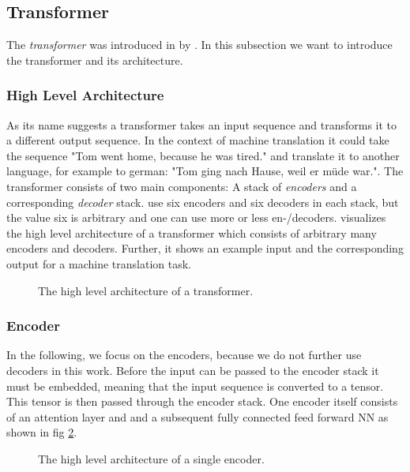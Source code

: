 
\subsection{Transformer}
\label{chp:fundamentals:sec:machine_learning:subsec:transformer}
The \textit{transformer} was introduced in \citeyear{Vaswani:2017} by \textcite{Vaswani:2017}.
In this subsection we want to introduce the transformer and its architecture.

\subsubsection{High Level Architecture}
As its name suggests a transformer takes an input sequence and transforms it to a different output sequence.
In the context of machine translation it could take the sequence "Tom went home, because he was tired." and translate it to another language, for example to german: "Tom ging nach Hause, weil er müde war.".
The transformer consists of two main components: A stack of \textit{encoders} and a corresponding \textit{decoder} stack.
\Textcite{Vaswani:2017} use six encoders and six decoders in each stack, but the value six is arbitrary and one can use more or less en-/decoders.
 visualizes the high level architecture of a transformer which consists of arbitrary many encoders and decoders.
Further, it shows an example input and the corresponding output for a machine translation task.
\begin{figure}[htpb]
    \centering
    
    \caption[High Level Transformer Architecture]{The high level architecture of a transformer.}\label{fig:fundamentals:machine_learning:transformer}
\end{figure}

\subsubsection{Encoder}
In the following, we focus on the encoders, because we do not further use decoders in this work.
Before the input can be passed to the encoder stack it must be embedded, meaning that the input sequence is converted to a tensor.
This tensor is then passed through the encoder stack.
One encoder itself consists of an attention layer and and a subsequent fully connected feed forward \ac{NN} as shown in fig \cref{fig:fundamentals:machine_learning:encoder}.
\begin{figure}[htpb]
    \centering
    
    \caption[High Level Encoder Architecture]{The high level architecture of a single encoder.}\label{fig:fundamentals:machine_learning:encoder}
\end{figure}

